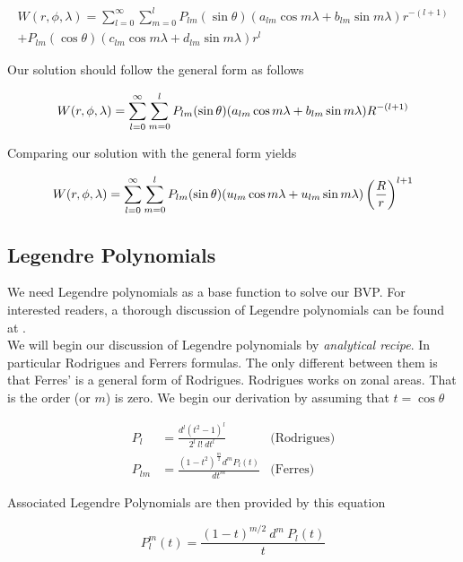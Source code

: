 \begin{align*}
W(r, \phi, \lambda) = \sum_{l=0}^{\infty}\sum_{m=0}^{l}P_{lm}(\sin \theta)(a_{lm} \cos m \lambda + b_{lm}\sin m \lambda) r^{-(l+1)}\\
+P_{lm}(\cos \theta)(c_{lm} \cos m \lambda + d_{lm} \sin m \lambda)r^l
\end{align*} 

Our solution should follow the general form as follows

\begin{equation}
W(r, \phi, \lambda) = \sum_{l=0}^{\infty}\sum_{m=0}^{l}P_{lm}(\sin \theta)(a_{lm} \cos m \lambda \\
+ b_{lm} \sin m \lambda) R^{-(l+1)}
\end{equation}

Comparing our solution with the general form yields

\begin{equation}
W(r, \phi, \lambda) = \sum_{l=0}^{\infty}\sum_{m=0}^{l}P_{lm}(\sin \theta)(u_{lm} \cos m \lambda \\
+ u_{lm} \sin m \lambda) \left(\frac{R}{r}\right)^{l+1}
\end{equation}


\subsection{Legendre Polynomials}
We need Legendre polynomials as a base function to solve our BVP. For interested readers, a thorough discussion of Legendre polynomials can be found at \cite{meziani}. 
\\
We will begin our discussion of Legendre polynomials by \textit{analytical recipe}. In particular Rodrigues and Ferrers formulas. The only different between them is that Ferres' is a general form of Rodrigues. Rodrigues works on zonal areas. That is the order (or $m$) is zero. We begin our derivation by assuming that $t=\cos \theta$

\begin{align}
P_{l} &= \frac{d^l(t^2-1)^l}{2^l\ l!\ dt^l} &\text{(Rodrigues)}\\
P_{lm} &= \frac{(1-t^2)^{\tfrac{m}{2}}d^mP_{l}(t)}{dt^m} &\text{(Ferres)}
\end{align}

Associated Legendre Polynomials are then provided by this equation

\begin{equation}
P_{l}^{m}(t) = \frac{(1-t)^{m/2}\ d^m\ P_l(t)}{t}
\end{equation}

